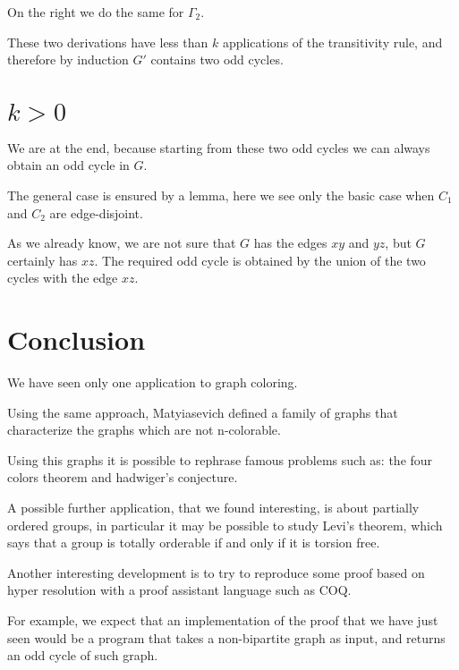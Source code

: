 \documentclass[12pt,a4paper,oneside]{article}
\begin{document}
On the right we do the same for $\Gamma_2$.

These two derivations have less than $k$ applications of the transitivity rule, and therefore by induction $G'$ contains two odd cycles.

\section{$k>0$ }
We are at the end, because starting from these two odd cycles we can always obtain an odd cycle in $G$.

The general case is ensured by a lemma, here we see only the basic case when $C_1$ and $C_2$ are edge-disjoint.

As we already know, we are not sure that $G$ has the edges $xy$ and $yz$, but $G$ certainly has $xz$. The required odd cycle is obtained by the union of the two cycles with the edge $xz$.

\newpage\section{Conclusion}
We have seen only one application to graph coloring.  

Using the same approach, Matyiasevich defined a family of graphs that characterize the graphs which are not n-colorable. 

Using this graphs it is possible to rephrase famous problems such as: the four colors theorem and hadwiger's conjecture.

A possible further application, that we found interesting, is about partially ordered groups, in particular it may be possible to study Levi’s theorem, which says that a  group is totally orderable if and only if it is torsion free.

Another interesting development is to try to reproduce some proof based on hyper resolution with a proof assistant language such as COQ. 

For example, we expect that an implementation of the proof that we have just seen would be a program that takes a non-bipartite graph as input, and returns an odd cycle of such graph.
\end{document}
